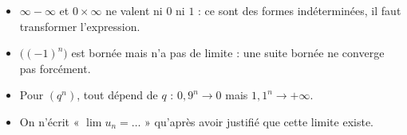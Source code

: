 \begin{attention}
\begin{itemize}
  \item $\infty-\infty$ et $0\times\infty$ ne valent ni $0$ ni $1$ : ce sont des formes indéterminées,
    il faut transformer l'expression.
  \item $\bigl((-1)^{n}\bigr)$ est bornée mais n'a pas de limite : une suite bornée ne converge pas forcément.
  \item Pour $(q^{n})$, tout dépend de $q$ : $0{,}9^{n}\to0$ mais $1{,}1^{n}\to+\infty$.
  \item On n'écrit « $\lim u_n=\dots$ » qu'après avoir justifié que cette limite existe.
\end{itemize}
\end{attention}


